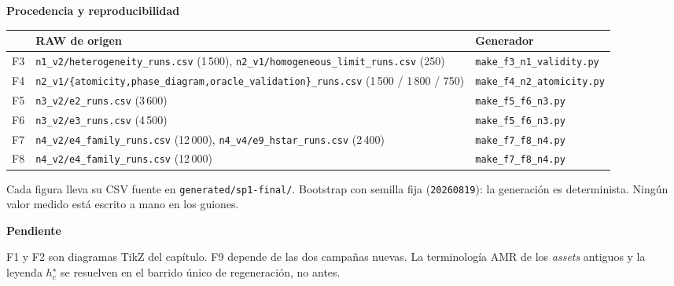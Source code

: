\documentclass[11pt,a4paper]{article}
\begin{document}
\vspace{3mm}
{\color{VIUOrange}\sffamily\bfseries\large Procedencia y reproducibilidad\par}
\vspace{2mm}
{\small
\begin{tabularx}{\linewidth}{@{}p{1.1cm}XX@{}}
\toprule
&\textbf{RAW de origen}&\textbf{Generador}\\
\midrule
F3&\texttt{n1\_v2/heterogeneity\_runs.csv} (1\,500), \texttt{n2\_v1/homogeneous\_limit\_runs.csv} (250)&\texttt{make\_f3\_n1\_validity.py}\\
F4&\texttt{n2\_v1/\{atomicity,phase\_diagram,oracle\_validation\}\_runs.csv} (1\,500 / 1\,800 / 750)&\texttt{make\_f4\_n2\_atomicity.py}\\
F5&\texttt{n3\_v2/e2\_runs.csv} (3\,600)&\texttt{make\_f5\_f6\_n3.py}\\
F6&\texttt{n3\_v2/e3\_runs.csv} (4\,500)&\texttt{make\_f5\_f6\_n3.py}\\
F7&\texttt{n4\_v2/e4\_family\_runs.csv} (12\,000), \texttt{n4\_v4/e9\_hstar\_runs.csv} (2\,400)&\texttt{make\_f7\_f8\_n4.py}\\
F8&\texttt{n4\_v2/e4\_family\_runs.csv} (12\,000)&\texttt{make\_f7\_f8\_n4.py}\\
\bottomrule
\end{tabularx}}

\vspace{2mm}
Cada figura lleva su CSV fuente en \texttt{generated/sp1-final/}. Bootstrap con
semilla fija (\texttt{20260819}): la generación es determinista. Ningún valor
medido está escrito a mano en los guiones.

\vspace{3mm}
{\color{VIUOrange}\sffamily\bfseries\large Pendiente\par}
\vspace{2mm}
F1 y F2 son diagramas TikZ del capítulo. F9 depende de las dos campañas nuevas.
La terminología AMR de los \emph{assets} antiguos y la leyenda $h_c^\star$ se
resuelven en el barrido único de regeneración, no antes.
\end{document}
